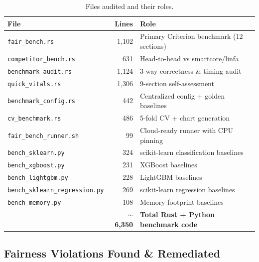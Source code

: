 \documentclass[11pt,a4paper]{article}
\begin{document}
\begin{table}[H]
\centering
\caption{Files audited and their roles.}
\label{tab:scope}
\small
\begin{tabular}{lrl}
\toprule
\textbf{File} & \textbf{Lines} & \textbf{Role} \\
\midrule
\texttt{fair\_bench.rs} & 1,102 & Primary Criterion benchmark (12 sections) \\
\texttt{competitor\_bench.rs} & 631 & Head-to-head vs smartcore/linfa \\
\texttt{benchmark\_audit.rs} & 1,124 & 3-way correctness \& timing audit \\
\texttt{quick\_vitals.rs} & 1,306 & 9-section self-assessment \\
\texttt{benchmark\_config.rs} & 442 & Centralized config + golden baselines \\
\texttt{cv\_benchmark.rs} & 486 & 5-fold CV + chart generation \\
\texttt{fair\_bench\_runner.sh} & 99 & Cloud-ready runner with CPU pinning \\
\texttt{bench\_sklearn.py} & 324 & scikit-learn classification baselines \\
\texttt{bench\_xgboost.py} & 231 & XGBoost baselines \\
\texttt{bench\_lightgbm.py} & 228 & LightGBM baselines \\
\texttt{bench\_sklearn\_regression.py} & 269 & scikit-learn regression baselines \\
\texttt{bench\_memory.py} & 108 & Memory footprint baselines \\
\midrule
& \textbf{$\sim$6,350} & \textbf{Total Rust + Python benchmark code} \\
\bottomrule
\end{tabular}
\end{table}

\subsection{Fairness Violations Found \& Remediated}
\end{document}
